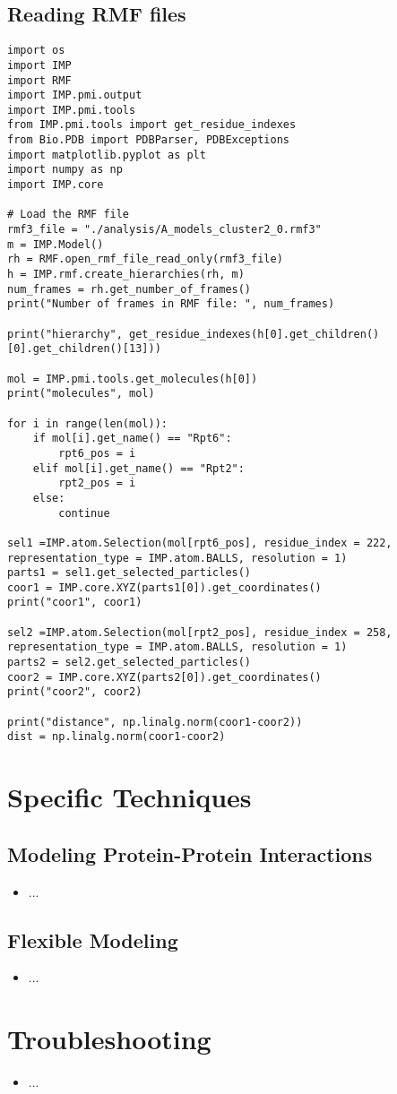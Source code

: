 \documentclass{article}
\begin{document}
\subsection{Reading RMF files}
\begin{verbatim}
import os
import IMP
import RMF
import IMP.pmi.output
import IMP.pmi.tools 
from IMP.pmi.tools import get_residue_indexes
from Bio.PDB import PDBParser, PDBExceptions
import matplotlib.pyplot as plt
import numpy as np
import IMP.core

# Load the RMF file
rmf3_file = "./analysis/A_models_cluster2_0.rmf3"
m = IMP.Model()
rh = RMF.open_rmf_file_read_only(rmf3_file)
h = IMP.rmf.create_hierarchies(rh, m)
num_frames = rh.get_number_of_frames()
print("Number of frames in RMF file: ", num_frames)

print("hierarchy", get_residue_indexes(h[0].get_children()[0].get_children()[13]))

mol = IMP.pmi.tools.get_molecules(h[0])
print("molecules", mol)

for i in range(len(mol)):
    if mol[i].get_name() == "Rpt6":
        rpt6_pos = i
    elif mol[i].get_name() == "Rpt2":
        rpt2_pos = i
    else:
        continue
        
sel1 =IMP.atom.Selection(mol[rpt6_pos], residue_index = 222, representation_type = IMP.atom.BALLS, resolution = 1)
parts1 = sel1.get_selected_particles()
coor1 = IMP.core.XYZ(parts1[0]).get_coordinates()
print("coor1", coor1)

sel2 =IMP.atom.Selection(mol[rpt2_pos], residue_index = 258, representation_type = IMP.atom.BALLS, resolution = 1)
parts2 = sel2.get_selected_particles()
coor2 = IMP.core.XYZ(parts2[0]).get_coordinates()
print("coor2", coor2)

print("distance", np.linalg.norm(coor1-coor2))
dist = np.linalg.norm(coor1-coor2)
\end{verbatim}

\section{Specific Techniques}
\subsection{Modeling Protein-Protein Interactions}
\begin{itemize}
    \item ...
\end{itemize}

\subsection{Flexible Modeling}
\begin{itemize}
    \item ...
\end{itemize}

\section{Troubleshooting}
\begin{itemize}
    \item ...
\end{itemize}


\end{document}
